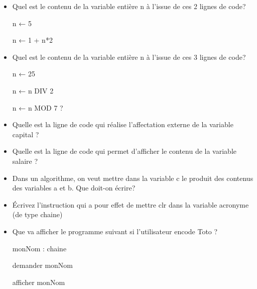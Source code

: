 \documentclass[11pt,a4paper]{article}
\begin{document}
					\begin{itemize}
				
			\item Quel est le contenu de la variable enti\`ere n \`a l'issue de ces 2 lignes de code?\par
				
                    n ← 5\par
				
                    n ← 1 + n*2\par
				 \textcolor{gray}{\underline{\hspace*{2em}}} 
			\item Quel est le contenu de la variable enti\`ere n \`a l'issue de ces 3 lignes de code?\par
				
                    n ← 25\par
				
                    n ← n DIV 2\par
				
                    n ← n MOD 7 ? \par
				 \textcolor{gray}{\underline{\hspace*{1em}}} 
			\item Quelle est la ligne de code qui r\'ealise l'affectation externe de la variable capital ? \textcolor{gray}{\underline{\hspace*{16em}}} 
			\item Quelle est la ligne de code qui permet d'afficher le contenu de la variable salaire ? \textcolor{gray}{\underline{\hspace*{16em}}} 
			\item Dans un algorithme, on veut mettre dans la variable c le produit des contenus des
									  variables a et b. Que doit-on \'ecrire? \textcolor{gray}{\underline{\hspace*{5em}}} 
			\item \'Ecrivez l'instruction qui a pour effet de mettre clr dans la variable acronyme (de type chaine)  \textcolor{gray}{\underline{\hspace*{16em}}} 
			\item Que va afficher le programme suivant si l'utilisateur encode \guillemotleft  Toto \guillemotright  ?\par
				
									  monNom : chaine\par
				
									  demander monNom\par
				
                    afficher \guillemotleft  monNom \guillemotright \par
				 \textcolor{gray}{\underline{\hspace*{5em}}} 
					\end{itemize}
				
\end{document}
